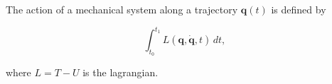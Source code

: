 The action of a mechanical system along a trajectory $\mathbf{q}(t)$ is defined by

$$\int_{t_0}^{t_1} L(\mathbf{q}, \dot{\mathbf{q}}, t)\, dt,$$

where $L = T - U$ is the lagrangian.
